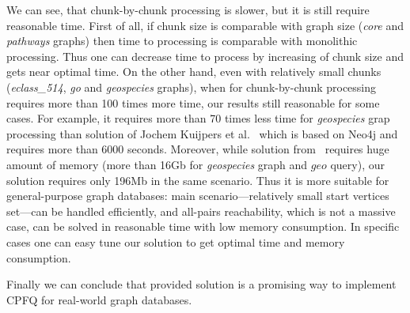 We can see, that chunk-by-chunk processing is slower, but it is still require reasonable time.
First of all, if chunk size is comparable with graph size (\textit{core} and \textit{pathways} graphs) then time to processing is comparable with monolithic processing.
Thus one can decrease time to process by increasing of chunk size and gets near optimal time.
On the other hand, even with relatively small chunks (\textit{eclass\_514}, \textit{go} and \textit{geospecies} graphs), when for chunk-by-chunk processing requires more than 100 times more time, our results still reasonable for some cases. 
For example, it requires more than 70 times less time for \textit{geospecies} grap processing than solution of Jochem Kuijpers et al.~\cite{Kuijpers:2019:ESC:3335783.3335791} which is based on Neo4j and requires more than 6000 seconds.
Moreover, while solution from~\cite{10.1145/3398682.3399163} requires huge amount of memory (more than 16Gb for \textit{geospecies} graph and $geo$ query), our solution requires only 196Mb in the same scenario.
Thus it is more suitable for general-purpose graph databases: main scenario---relatively small start vertices set---can be handled efficiently, and all-pairs reachability, which is not a massive case, can be solved in reasonable time with low memory consumption. In specific cases one can easy tune our solution to get optimal time and memory consumption.

Finally we can conclude that provided solution is a promising way to implement CPFQ for real-world graph databases.

